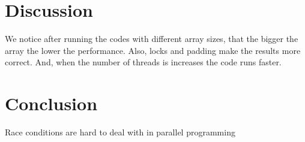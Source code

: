 \documentclass[10pt,a4paper]{article} %
\begin{document}
\vspace{10cm}

\section{Discussion}

We notice after running the codes with different array sizes, that the bigger the array the lower the performance.
Also, locks and padding make the results more correct.
And, when the number of threads is increases the code runs faster.


\section{Conclusion}
Race conditions are hard to deal with in parallel programming

\end{document}
